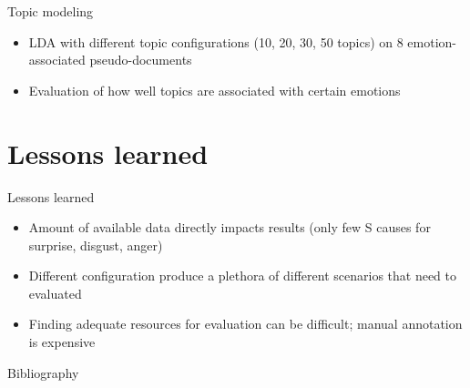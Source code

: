 \documentclass[11pt]{beamer}
\begin{document}
\begin{frame}{Topic modeling}
\begin{itemize}
	\item LDA with different topic configurations (10, 20, 30, 50 topics) on 8 emotion-associated pseudo-documents
	\item Evaluation of how well topics are associated with certain emotions
\end{itemize}

\end{frame}

\section{Lessons learned}

\begin{frame}{Lessons learned}
	\begin{itemize}
		\item Amount of available data directly impacts results (only few S causes for surprise, disgust, anger)
		\item Different configuration produce a plethora of different scenarios that need to evaluated
		\item Finding adequate resources for evaluation can be difficult; manual annotation is expensive
	\end{itemize}
\end{frame}

\begin{frame}[allowframebreaks]{Bibliography}


\end{frame}
\end{document}
